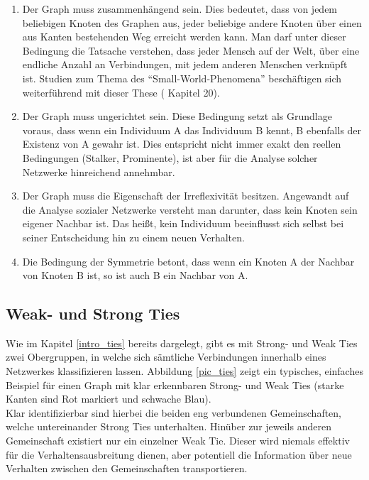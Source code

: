 \documentclass[12pt]{article}
\begin{document}
\begin{enumerate}
\label{enum_graphConditions}
\item Der Graph muss zusammenhängend sein. Dies bedeutet, dass von jedem beliebigen Knoten des Graphen aus, jeder beliebige andere Knoten über einen aus Kanten bestehenden Weg erreicht werden kann. Man darf unter dieser Bedingung die Tatsache verstehen, dass jeder Mensch auf der Welt, über eine endliche Anzahl an Verbindungen, mit jedem anderen Menschen verknüpft ist. Studien zum Thema des "`Small-World-Phenomena"' beschäftigen sich weiterführend mit dieser These (\cite{Easly10} Kapitel 20).
\item Der Graph muss ungerichtet sein. Diese Bedingung setzt als Grundlage voraus, dass wenn ein Individuum A das Individuum B kennt, B ebenfalls der Existenz von A gewahr ist. Dies entspricht nicht immer exakt den reellen Bedingungen (Stalker, Prominente), ist aber für die Analyse solcher Netzwerke hinreichend annehmbar.
\item Der Graph muss die Eigenschaft der Irreflexivität besitzen. Angewandt auf die Analyse sozialer Netzwerke versteht man darunter, dass kein Knoten sein eigener Nachbar ist. Das heißt, kein Individuum beeinflusst sich selbst bei seiner Entscheidung hin zu einem neuen Verhalten. 
\item Die Bedingung der Symmetrie betont, dass wenn ein Knoten A der Nachbar von Knoten B ist, so ist auch B ein Nachbar von A.
\end{enumerate}


\subsection{Weak- und Strong Ties}
Wie im Kapitel \ref{intro_ties} bereits dargelegt, gibt es mit Strong- und Weak Ties zwei Obergruppen, in welche sich sämtliche Verbindungen innerhalb eines Netzwerkes klassifizieren lassen. Abbildung \ref{pic_ties} zeigt ein typisches, einfaches Beispiel für einen Graph mit klar erkennbaren Strong- und Weak Ties (starke Kanten sind Rot markiert und schwache Blau).\\
Klar identifizierbar sind hierbei die beiden eng verbundenen Gemeinschaften, welche untereinander Strong Ties unterhalten. Hinüber zur jeweils anderen Gemeinschaft existiert nur ein einzelner Weak Tie. Dieser wird niemals effektiv für die Verhaltensausbreitung dienen, aber potentiell die Information über neue Verhalten zwischen den Gemeinschaften transportieren.
\end{document}
